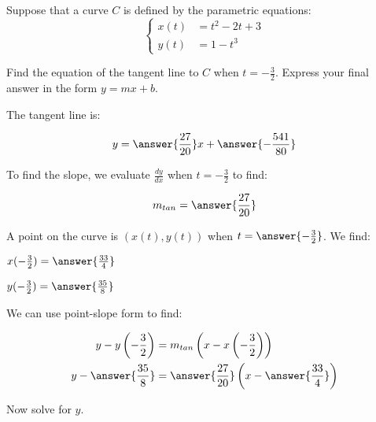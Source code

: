 \documentclass{ximera}
\author{Alex Beckwith}
\begin{document}
\begin{exercise}
Suppose that a curve $C$ is defined by the parametric equations:
\[
\begin{cases}
x(t) &= t^2-2t+3 \\
y(t) &= 1-t^3
\end{cases}
\]

Find the equation of the tangent line to $C$ when $t = -\frac{3}{2}$.  Express your final answer in the form $y=mx+b$.

The tangent line is:

\[
y = \answer{\frac{27}{20}}x+\answer{-\frac{541}{80}}
\]

\begin{hint}
To find the slope, we evaluate $\frac{dy}{dx}$ when $t=-\frac{3}{2}$ to find:

\[
m_{tan} = \answer{\frac{27}{20}}
\]

A point on the curve is $(x(t),y(t))$ when $t=\answer{-\frac{3}{2}}$.  We find:

$x(-\frac{3}{2}) = \answer{\frac{33}{4}}$

$y(-\frac{3}{2}) = \answer{\frac{35}{8}}$

We can use point-slope form to find:

\begin{align*}
y-y\left(-\frac{3}{2}\right) &= m_{tan}\left(x-x\left(-\frac{3}{2}\right)\right) \\
y- \answer{\frac{35}{8}} &= \answer{\frac{27}{20}} \left( x-\answer{\frac{33}{4}} \right)
\end{align*}

Now solve for $y$.

\end{hint}

\end{exercise}
\end{document}
